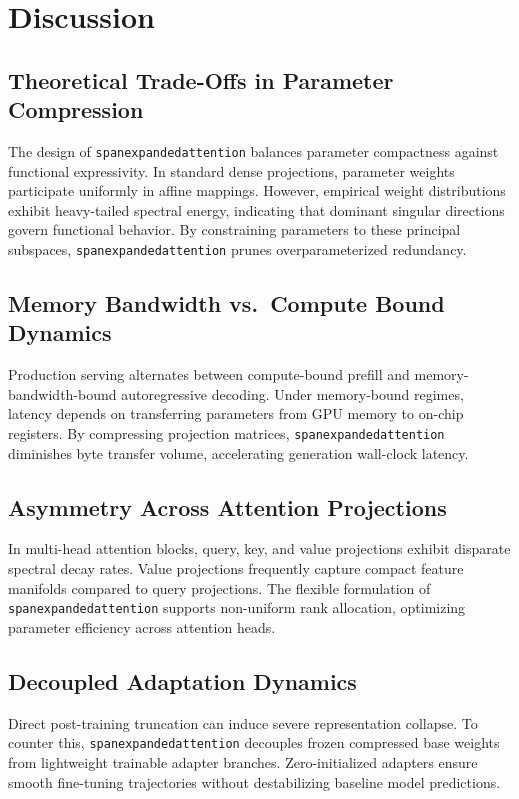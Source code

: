 \section{Discussion}

\subsection{Theoretical Trade-Offs in Parameter Compression}
The design of \texttt{spanexpandedattention} balances parameter compactness against functional expressivity. In standard dense projections, parameter weights participate uniformly in affine mappings. However, empirical weight distributions exhibit heavy-tailed spectral energy, indicating that dominant singular directions govern functional behavior. By constraining parameters to these principal subspaces, \texttt{spanexpandedattention} prunes overparameterized redundancy.

\subsection{Memory Bandwidth vs.\ Compute Bound Dynamics}
Production serving alternates between compute-bound prefill and memory-bandwidth-bound autoregressive decoding. Under memory-bound regimes, latency depends on transferring parameters from GPU memory to on-chip registers. By compressing projection matrices, \texttt{spanexpandedattention} diminishes byte transfer volume, accelerating generation wall-clock latency.

\subsection{Asymmetry Across Attention Projections}
In multi-head attention blocks, query, key, and value projections exhibit disparate spectral decay rates. Value projections frequently capture compact feature manifolds compared to query projections. The flexible formulation of \texttt{spanexpandedattention} supports non-uniform rank allocation, optimizing parameter efficiency across attention heads.

\subsection{Decoupled Adaptation Dynamics}
Direct post-training truncation can induce severe representation collapse. To counter this, \texttt{spanexpandedattention} decouples frozen compressed base weights from lightweight trainable adapter branches. Zero-initialized adapters ensure smooth fine-tuning trajectories without destabilizing baseline model predictions.

